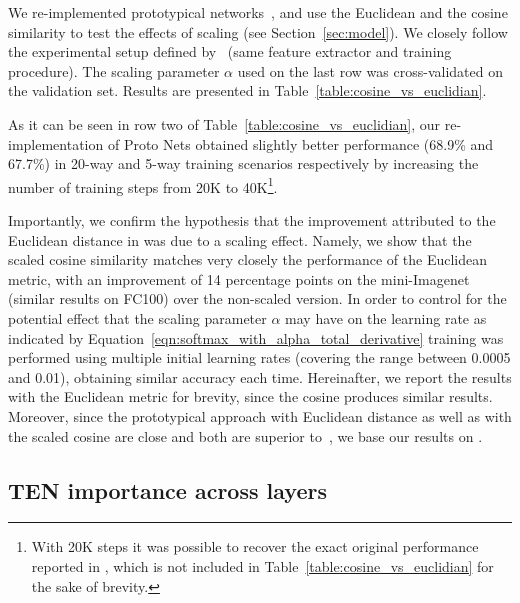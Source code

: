 \documentclass{article}
\begin{document}
We re-implemented prototypical networks~\citep{snell2017prototypical}, and use the Euclidean and the cosine similarity to test the effects of scaling (see Section~\ref{sec:model}). We closely follow the experimental setup defined by~\citet{snell2017prototypical} (same feature extractor and training procedure). The scaling parameter $\alpha$ used on the last row was cross-validated on the validation set. Results are presented in Table~\ref{table:cosine_vs_euclidian}.

As it can be seen in row two of Table~\ref{table:cosine_vs_euclidian}, our re-implementation of Proto Nets \citep{snell2017prototypical} obtained slightly better performance (68.9\% and 67.7\%) in 20-way and 5-way training scenarios respectively by increasing the number of training steps from 20K to 40K\footnote{With 20K steps it was possible to recover the exact original performance reported in \citet{snell2017prototypical}, which is not included in Table~\ref{table:cosine_vs_euclidian} for the sake of brevity.}.

Importantly, we confirm the hypothesis that the improvement attributed to the Euclidean distance in \cite{snell2017prototypical} was due to a scaling effect. Namely, we show that the scaled cosine similarity matches very closely the performance of the Euclidean metric, with an improvement of 14 percentage points on the mini-Imagenet (similar results on FC100) over the non-scaled version. In order to control for the potential effect that the scaling parameter $\alpha$ may have on the learning rate as indicated by Equation~\eqref{eqn:softmax_with_alpha_total_derivative} training was performed using multiple initial learning rates (covering the range between 0.0005 and 0.01), obtaining similar accuracy each time.  Hereinafter, we report the results with the Euclidean metric for brevity, since the cosine produces similar results. Moreover, since the prototypical approach with Euclidean distance as well as with the scaled cosine are close and both are superior to~\cite{vinyals2016matching}, we base our results on \cite{snell2017prototypical}.




\subsection{TEN importance across layers} \label{ssec:tbn_importance_vs_depth}
\end{document}
